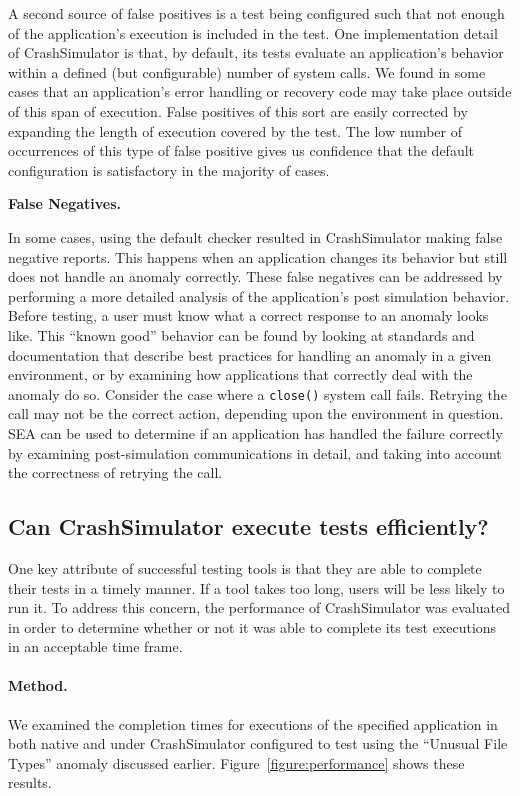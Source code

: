 A second source of false positives is a test being configured such that not
enough of the application's execution is included in the test.
One implementation detail of CrashSimulator is that,
by default,
its tests evaluate an application's behavior
within a defined (but configurable) number of system calls.
We found in some cases
that an application's error handling or recovery code
may take place outside of this span of execution.
False positives
of this sort
are easily corrected
by expanding the length of execution
covered by the test.
The low number of occurrences of this
type of false positive gives us confidence that the default configuration
is satisfactory in the majority of cases.

\textbf{False Negatives.}

In some cases,
using the default checker resulted
in CrashSimulator making false negative reports.
This happens when
an application changes its behavior
but still does not handle an anomaly correctly.
These false negatives can be addressed
by performing a more detailed analysis
of the application's post simulation behavior.
Before testing,
a user must know
what a correct response
to an anomaly looks like.
This ``known good'' behavior can be found
by looking at standards and documentation
that describe best practices for handling an anomaly
in a given environment,
or by examining how applications that correctly
deal with the anomaly do so.
Consider the case where a {\tt close()} system call fails.
Retrying the call may not be the correct action,
depending upon the environment in question.
SEA can be used to determine if an application
has handled the failure correctly
by examining post-simulation communications in detail,
and taking into account the correctness of retrying the call.

\subsection{Can CrashSimulator execute tests efficiently?}
\label{sec-perf}

One key attribute of successful testing tools is that they are able to
complete their tests in a timely manner.  If a tool takes too long,
users will be less likely to run it.
To address this concern, the performance of CrashSimulator was
evaluated in order to determine whether or not it was able to complete its
test executions in an acceptable time frame.

\paragraph{Method.}
We examined the completion
times for executions of the specified application in both
native and under CrashSimulator configured to test using the ``Unusual File
Types'' anomaly discussed earlier.
Figure~\ref{figure:performance} shows these results.

